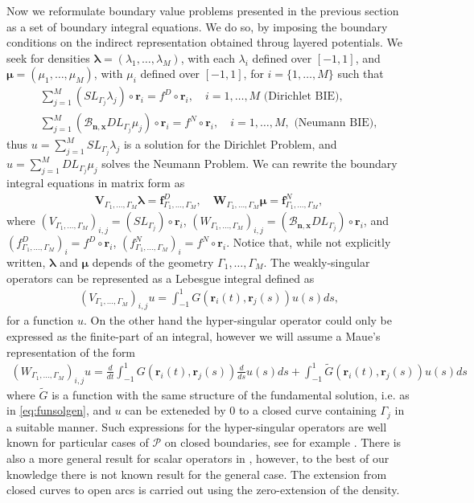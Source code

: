\documentclass{article}
\newcommand{\bmu} {\bm{\mu}}
\newcommand{\bla}{\boldsymbol \lambda}
\newcommand{\bn}{\bm{n}}
\newcommand{\br}{\bm{r}}
\newcommand{\bx}{\bm{x}}
\begin{document}
Now we reformulate boundary value problems presented in the previous section as a set of boundary integral equations. We do so, by imposing the boundary conditions on the indirect representation obtained throug layered potentials. We seek for densities $\bla = (\lambda_1,\hdots,\lambda_M)$, with each $\lambda_i$ defined over $[-1,1]$, and $\bmu = (\mu_1, \hdots, \mu_M)$, with $\mu_i$ defined over $[-1,1]$, for $i = \{1,\hdots,M\}$ such that
\begin{align*}
\sum_{j=1}^M (SL_{\Gamma_j} \lambda_j )\circ \br_i = f^D\circ \br_i, \quad i = 1,\hdots,M \text{ (Dirichlet BIE)}, \\
\sum_{j=1}^M (\mathcal{B}_{\bn,\bx}DL_{\Gamma_j} \mu_j )\circ \br_i = f^N\circ \br_i, \quad i = 1,\hdots,M,
\text{ (Neumann BIE)},
\end{align*}
 thus $u = \sum_{j=1}^M SL_{\Gamma_j} \lambda_j $ is a solution for the Dirichlet Problem, and  $u = \sum_{j=1}^M DL_{\Gamma_j} \mu_j $ solves the Neumann Problem. We can rewrite the boundary integral equations in matrix form as 
\begin{align}
\label{eq:bios}
\mathbf{V}_{\Gamma_1,\hdots,\Gamma_M} \bla = \mathbf{f}^D_{\Gamma_1,\hdots,\Gamma_M}, \quad \mathbf{W}_{\Gamma_1,\hdots,\Gamma_M} \bmu = \mathbf{f}^N_{\Gamma_1,\hdots,\Gamma_M},
\end{align}
where $(V_{\Gamma_1,\hdots,\Gamma_M})_{i,j} = (SL_{\Gamma_j}  )\circ \br_i$, $(W_{\Gamma_1,\hdots,\Gamma_M})_{i,j} = (\mathcal{B}_{\bn,\bx}DL_{\Gamma_j} )\circ \br_i$, and $(f^D_{\Gamma_1,\hdots,\Gamma_M})_i = f^D \circ \br_i$, $(f^N_{\Gamma_1,\hdots,\Gamma_M})_i = f^N \circ \br_i$. Notice that, while not explicitly written, $\bla$ and $\bmu$ depends of the geometry $\Gamma_1,\hdots,\Gamma_M$. The weakly-singular operators can be represented as a Lebesgue integral defined as 
\begin{align*}
(V_{\Gamma_1,\hdots,\Gamma_M})_{i,j}u = \int_{-1}^1G(\br_i(t),\br_j(s)) u(s) ds,
\end{align*}
for a function $u$. On the other hand the hyper-singular operator could only be expressed as the finite-part of an integral, however we will assume a Maue's representation of the form 
\begin{align}
\label{eq:mauesrep}
(W_{\Gamma_1,\hdots,\Gamma_M})_{i,j}u =  \frac{d}{dt}\int_{-1}^1G(\br_i(t),\br_j(s)) \frac{d}{ds}u(s) ds + 
\int_{-1}^1\widetilde{G}(\br_i(t),\br_j(s))u(s) ds
\end{align} 
where $\widetilde{G}$ is a function with the same structure of the fundamental solution, i.e. as in \eqref{eq:funsolgen}, and $u$ can be exteneded by 0 to a closed curve containing $\Gamma_j$ in a suitable manner. Such expressions for the hyper-singular operators are well known for particular cases of $\mathcal{P}$ on closed boundaries, see for example \cite{Nedelec1982,Maue1949}. There is also a more general result for scalar operators in \cite[Chapter 3.3.4]{Sauter:2011}, however, to the best of our knowledge there is not known result for the general case. The extension  from closed curves to open arcs is carried out using the zero-extension of the density. 
\end{document}
